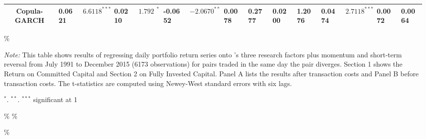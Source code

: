 \documentclass[a4paper]{article}
\begin{document}
\begin{sidewaystable}
\begin{threeparttable}[H]
\begin{tabularx}{\textwidth}{@{\extracolsep{\fill}}lllllllllllllll@{}}
				\multicolumn{1}{c}{Copula-GARCH} & 0.0621 & $6.6118^{***}$ & 0.0210 & $1.7923^{*}$ & -0.0652 & $-2.0670^{**}$ & 0.0078 & 0.2777 & 0.0200 & 1.2076 & 0.0474 & $2.7118^{***}$ & 0.0072 & 0.0064 \\
				\bottomrule
			\end{tabularx}\%
			\begin{tablenotes}
				\item \textit{Note:} \scriptsize  This table shows results of regressing daily portfolio return series onto \citet*{ff93}'s three research factors plus momentum and short-term reversal from July 1991 to December 2015 (6173 observations) for pairs traded in the same day the pair diverges. Section 1 shows the Return on Committed Capital and Section 2 on Fully Invested Capital. Panel A lists the results after transaction costs and Panel B before transaction costs. The t-statistics are computed using Newey-West standard errors with six lags.
				\item \scriptsize $^{\ast}$. $^{\ast\ast}$. $^{\ast\ast\ast}$  significant at 1\\%
			\end{tablenotes}
		\end{threeparttable}\%
		\label{tab:table110}\%
	\end{sidewaystable}\%
	
\end{document}
